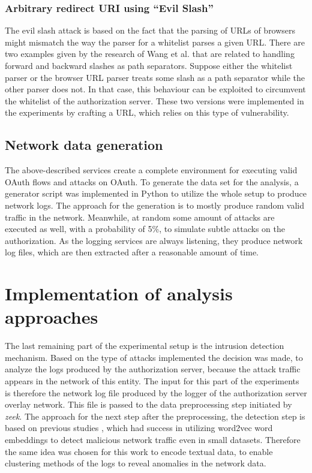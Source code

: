 \documentclass[
    fontsize=12pt,
    headings=small,
    parskip=half,           %
    bibliography=totoc,
    numbers=noenddot,       %
    open=any,               %
    ]{scrreprt}
\begin{document}
\subsubsection{Arbitrary redirect URI using ``Evil Slash''}
The evil slash attack is based on the fact that the parsing of URLs of browsers might mismatch the way the parser for a whitelist parses a given URL. There are two examples given by the research of Wang et al. that are related to handling forward and backward slashes as path separators. Suppose either the whitelist parser or the browser URL parser treats some slash as a path separator while the other parser does not. In that case, this behaviour can be exploited to circumvent the whitelist of the authorization server. These two versions were implemented in the experiments by crafting a URL, which relies on this type of vulnerability.

\subsection{Network data generation}
The above-described services create a complete environment for executing valid OAuth flows and attacks on OAuth. To generate the data set for the analysis, a generator script was implemented in Python to utilize the whole setup to produce network logs. The approach for the generation is to mostly produce random valid traffic in the network. Meanwhile, at random some amount of attacks are executed as well, with a probability of 5\%, to simulate subtle attacks on the authorization. As the logging services are always listening, they produce network log files, which are then extracted after a reasonable amount of time.

\section{Implementation of analysis approaches}
The last remaining part of the experimental setup is the intrusion detection mechanism. Based on the type of attacks implemented the decision was made, to analyze the logs produced by the authorization server, because the attack traffic appears in the network of this entity. The input for this part of the experiments is therefore the network log file produced by the logger of the authorization server overlay network. This file is passed to the data preprocessing step initiated by \emph{zeek}. The approach for the next step after the preprocessing, the detection step is based on previous studies \cite{carrasco2018unsupervised} \cite{zhuo2017network}, which had success in utilizing word2vec word embeddings to detect malicious network traffic even in small datasets. Therefore the same idea was chosen for this work to encode textual data, to enable clustering methods of the logs to reveal anomalies in the network data.
\end{document}
